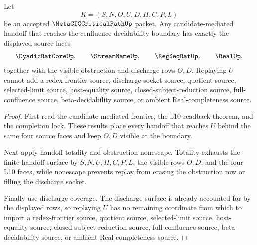 \begin{theorem}
\label{thm:metacic-critical-path-candidate-frontier-source-exhaustion}
Let
$$
K=(S,N,O,U,D,H,C,P,L)
$$
be an accepted $\MetaCICCriticalPathUp$ packet. Any candidate-mediated handoff that reaches the confluence-decidability boundary has exactly the displayed source faces
$$
\DyadicRatCoreUp,\qquad
\StreamNameUp,\qquad
\RegSeqRatUp,\qquad
\RealUp,
$$
together with the visible obstruction and discharge rows $O,D$. Replaying $U$ cannot add a redex-frontier source, discharge-socket source, quotient source, selected-limit source, host-equality source, closed-subject-reduction source, full-confluence source, beta-decidability source, or ambient Real-completeness source.
\end{theorem}
\begin{proof}
First read the candidate-mediated frontier, the L10 readback theorem, and the completion lock. These results place every handoff that reaches $U$ behind the same four source faces and keep $O,D$ visible at the boundary.

Next apply handoff totality and obstruction nonescape. Totality exhausts the finite handoff surface by $S,N,U,H,C,P,L$, the visible rows $O,D$, and the four L10 faces, while nonescape prevents replay from erasing the obstruction row or filling the discharge socket.

Finally use discharge coverage. The discharge surface is already accounted for by the displayed rows, so replaying $U$ has no remaining coordinate from which to import a redex-frontier source, quotient source, selected-limit source, host-equality source, closed-subject-reduction source, full-confluence source, beta-decidability source, or ambient Real-completeness source.
\end{proof}

